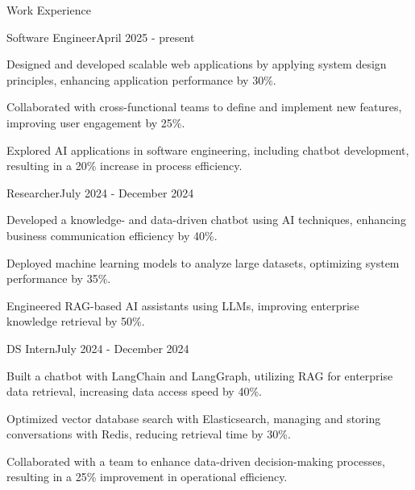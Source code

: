 \documentclass{resume} %
\begin{document}
    \begin{rSection}{Work Experience}
                    \begin{rSubsection}
                {Software Engineer}{April 2025 - present}
                                    {}
                                {}
                                    \item Designed and developed scalable web applications by applying system design principles, enhancing application performance by 30\%.
                                    \item Collaborated with cross{-}functional teams to define and implement new features, improving user engagement by 25\%.
                                    \item Explored AI applications in software engineering, including chatbot development, resulting in a 20\% increase in process efficiency.
                            \end{rSubsection}
                    \begin{rSubsection}
                {Researcher}{July 2024 - December 2024}
                                    {}
                                {}
                                    \item Developed a knowledge{-} and data{-}driven chatbot using AI techniques, enhancing business communication efficiency by 40\%.
                                    \item Deployed machine learning models to analyze large datasets, optimizing system performance by 35\%.
                                    \item Engineered RAG{-}based AI assistants using LLMs, improving enterprise knowledge retrieval by 50\%.
                            \end{rSubsection}
                    \begin{rSubsection}
                {DS Intern}{July 2024 - December 2024}
                                    {}
                                {}
                                    \item Built a chatbot with LangChain and LangGraph, utilizing RAG for enterprise data retrieval, increasing data access speed by 40\%.
                                    \item Optimized vector database search with Elasticsearch, managing and storing conversations with Redis, reducing retrieval time by 30\%.
                                    \item Collaborated with a team to enhance data{-}driven decision{-}making processes, resulting in a 25\% improvement in operational efficiency.
                            \end{rSubsection}
            \end{rSection}
\end{document}
